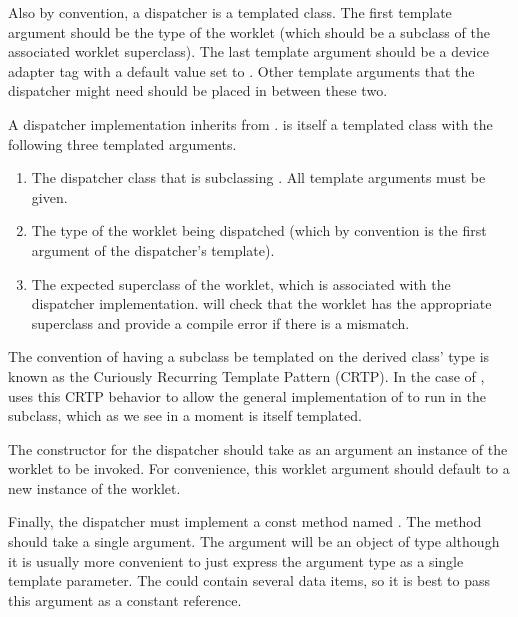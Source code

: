Also by convention, a dispatcher is a templated class.
The first template argument should be the type of the worklet (which should be a subclass of the associated worklet superclass).
The last template argument should be a device adapter tag with a default value set to .
Other template arguments that the dispatcher might need should be placed in between these two.


A dispatcher implementation inherits from .
 is itself a templated class with the following three templated arguments.
\begin{enumerate}
\item
  The dispatcher class that is subclassing .
  All template arguments must be given.
\item
  The type of the worklet being dispatched (which by convention is the first argument of the dispatcher's template).
\item
  The expected superclass of the worklet, which is associated with the dispatcher implementation.
   will check that the worklet has the appropriate superclass and provide a compile error if there is a mismatch.
\end{enumerate}

\begin{didyouknow}
  The convention of having a subclass be templated on the derived class' type is known as the Curiously Recurring Template Pattern (CRTP).
  In the case of , \VTKm uses this CRTP behavior to allow the general implementation of  to run  in the subclass, which as we see in a moment is itself templated.
\end{didyouknow}


The constructor for the dispatcher should take as an argument an instance of the worklet to be invoked.
For convenience, this worklet argument should default to a new instance of the worklet.


Finally, the dispatcher must implement a const method named .
The  method should take a single argument.
The argument will be an object of type  although it is usually more convenient to just express the argument type as a single template parameter.
The  could contain several data items, so it is best to pass this argument as a constant reference.

